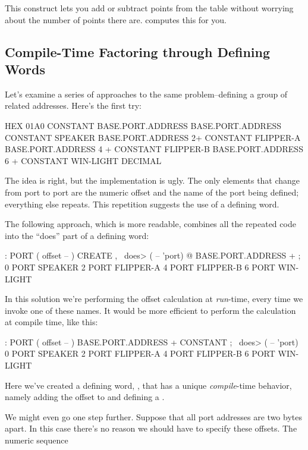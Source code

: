 This construct lets you add or subtract points from the table without
worrying about the number of points there are. \Forth{} computes this
for you.

\subsection{Compile-Time Factoring through Defining Words}%
%
Let's examine a series of approaches to the same problem--defining a
group of related addresses. Here's the first try:

\begin{Code}
HEX 01A0 CONSTANT BASE.PORT.ADDRESS
BASE.PORT.ADDRESS CONSTANT SPEAKER
BASE.PORT.ADDRESS 2+ CONSTANT FLIPPER-A
BASE.PORT.ADDRESS 4 + CONSTANT FLIPPER-B
BASE.PORT.ADDRESS 6 + CONSTANT WIN-LIGHT
DECIMAL
\end{Code}
The idea is right, but the implementation is ugly. The only elements
that change from port to port are the numeric offset and the name of
the port being defined; everything else repeats. This repetition
suggests the use of a defining word.

The following approach, which is more readable, combines all the
repeated code into the ``does'' part  of a defining word:

\begin{Code}
: PORT  ( offset -- )  CREATE ,
   \ does>  ( -- 'port) @ BASE.PORT.ADDRESS + ;
0 PORT SPEAKER
2 PORT FLIPPER-A
4 PORT FLIPPER-B
6 PORT WIN-LIGHT
\end{Code}
In this solution we're performing the offset calculation at
\emph{run}-time, every time we invoke one of these names. It would be
more efficient to perform the calculation at compile time, like this:

\begin{Code}
: PORT  ( offset -- )  BASE.PORT.ADDRESS + CONSTANT ;
   \ does>  ( -- 'port)
0 PORT SPEAKER
2 PORT FLIPPER-A
4 PORT FLIPPER-B
6 PORT WIN-LIGHT
\end{Code}
Here we've created a defining word, , that has a unique
\emph{compile}-time behavior, namely adding the offset to
 and defining a .

We might even go one step further. Suppose that all port addresses are
two bytes apart. In this case there's no reason we should have to
specify these offsets. The numeric sequence

